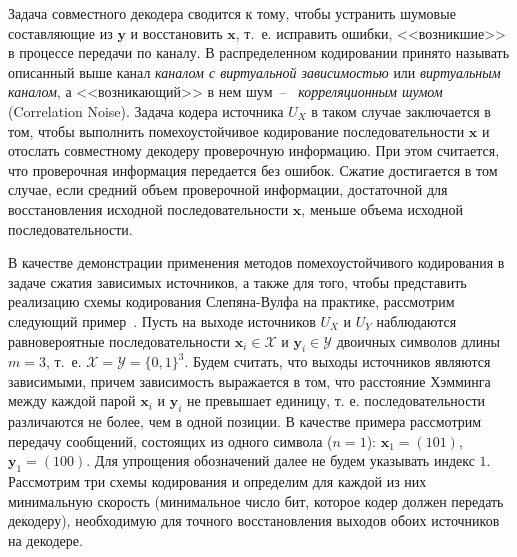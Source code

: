 Задача совместного декодера сводится к тому, чтобы устранить шумовые составляющие из $\mathbf{y}$ и восстановить $\mathbf{x}$, т.~е. исправить ошибки, <<возникшие>> в процессе передачи по каналу. В распределенном кодировании принято называть описанный выше канал \textit{каналом с виртуальной зависимостью} или \textit{виртуальным каналом}, а <<возникающий>> в нем шум~--~ \textit{корреляционным шумом} (Correlation Noise). Задача кодера источника $U_X$ в таком случае заключается в том, чтобы выполнить помехоустойчивое кодирование последовательности $\mathbf{x}$ и отослать совместному декодеру проверочную информацию. При этом считается, что проверочная информация передается без ошибок. Сжатие достигается в том случае, если средний объем проверочной информации, достаточной для восстановления исходной последовательности $\mathbf{x}$, меньше объема исходной последовательности.

В качестве демонстрации применения методов помехоустойчивого кодирования в задаче сжатия зависимых источников, а также для того, чтобы представить  реализацию схемы кодирования Слепяна-Вулфа на практике, рассмотрим следующий пример~\cite{1184140}. Пусть на выходе источников $U_X$ и $U_Y$ наблюдаются равновероятные последовательности $\mathbf{x}_i \in \mathcal{X}$ и $\mathbf{y}_i \in \mathcal{Y}$ двоичных символов длины $m=3$, т.~е. $\mathcal{X}=\mathcal{Y}=\{0,1\}^3$. Будем считать, что выходы источников являются зависимыми, причем зависимость выражается в том, что расстояние Хэмминга между каждой парой $\mathbf{x}_i$ и $\mathbf{y}_i$ не превышает единицу, т. е. последовательности различаются не более, чем в одной позиции.  В качестве примера рассмотрим передачу сообщений, состоящих из одного символа ($n=1$): $\mathbf{x}_1=(101)$, $\mathbf{y}_1=(100)$. Для упрощения обозначений далее не будем указывать индекс $1$. Рассмотрим три схемы кодирования и определим для каждой из них минимальную скорость (минимальное число бит, которое кодер должен передать декодеру), необходимую для точного восстановления выходов обоих источников на декодере.

